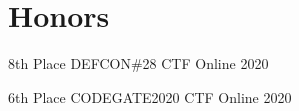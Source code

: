 \section{Honors}
\begin{cvhonors}

\cvhonor
{8th Place} %
{DEFCON\#28 CTF} %
{Online} %
{2020} %

\cvhonor
{6th Place} %
{CODEGATE2020 CTF} %
{Online} %
{2020} %

\end{cvhonors}